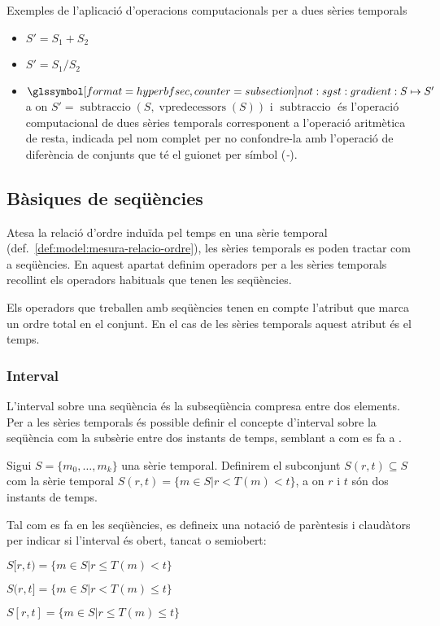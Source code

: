 Exemples de l'aplicació d'operacions computacionals per a dues sèries
temporals
\begin{itemize}
\item $S' = S_1 + S_2$
\item $S' = S_1 / S_2$
\item $\glssymbolsec{not:sgst:gradient}: S \mapsto S'$ a on $S'=
  \operatorname{subtraccio}(S, \operatorname{vpredecessors}(S))$ i
  $\operatorname{subtraccio}$ és l'operació computacional de dues
  sèries temporals corresponent a l'operació aritmètica de resta,
  indicada pel nom complet per no confondre-la amb l'operació de diferència de
  conjunts que té el guionet per símbol (\emph{-}).
\end{itemize}









\subsection{Bàsiques de seqüències}

Atesa la relació d'ordre induïda pel temps en una sèrie temporal
(def.\ \ref{def:model:mesura-relacio-ordre}), les sèries temporals es
poden tractar com a seqüències.  En aquest apartat definim operadors
per a les sèries temporals recollint els operadors habituals que tenen
les seqüències.

Els operadors que treballen amb seqüències tenen en compte l'atribut
que marca un ordre total en el conjunt. En el cas de les sèries
temporals aquest atribut és el temps.



\subsubsection{Interval}

L'interval sobre una seqüència és la subseqüència compresa entre dos
elements.  Per a les sèries temporals és possible definir el concepte
d'interval sobre la seqüència com la subsèrie entre dos instants de
temps, semblant a com es fa a \cite{last:keogh,last:hetland}.

\begin{definition}[Interval]
  \label{def:model:st-interval}
  Sigui $S=\{m_0, \ldots, m_k\}$ una sèrie temporal. Definirem el subconjunt
  $S(r,t) \subseteq S$ com la sèrie temporal $S(r,t)=\{m\in S
  | r<T(m)<t\}$, a on $r$ i $t$ són dos instants de temps.

  Tal com es fa en les seqüències, es defineix una notació de
  parèntesis i claudàtors per indicar si l'interval és obert, tancat o
  semiobert:

  $S[r,t)=\{m\in S  | r\leq T(m)< t\}$

  $S(r,t]=\{m\in S  | r<T(m)\leq t\}$

  $S[r,t]=\{m\in S  | r\leq T(m)\leq t\}$
\end{definition}


